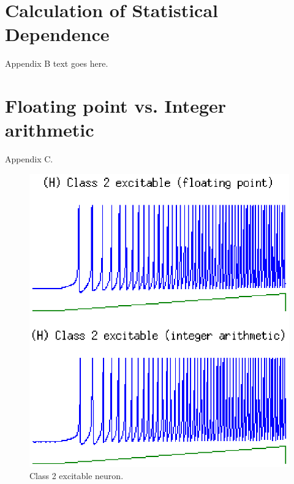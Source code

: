 \documentclass[journal]{./sty/IEEEtran}
\begin{document}
\section{Calculation of Statistical Dependence}
Appendix B text goes here.

\section{Floating point vs. Integer arithmetic}
Appendix C.

\begin{figure}
\centering
\includegraphics[scale=0.6]{imgs/izh_class_2_excitable}
\caption{Class 2 excitable neuron.\label{fig:excit2}}
\end{figure}
\end{document}
